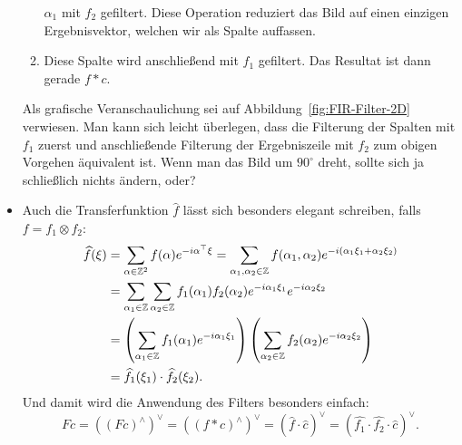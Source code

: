 \begin{remark}
\begin{itemize}
\begin{enumerate}
    $ \alpha_{1} $ mit $ f_{2} $ gefiltert. Diese Operation reduziert das Bild auf einen
    einzigen Ergebnisvektor, welchen wir als Spalte auffassen.
  \item Diese Spalte wird anschließend mit $ f_{1} $ gefiltert. Das Resultat ist dann gerade 
    $ f * c $.
  \end{enumerate}
  Als grafische Veranschaulichung sei auf Abbildung~\ref{fig:FIR-Filter-2D} verwiesen. Man kann
  sich leicht überlegen, dass die Filterung der Spalten mit $ f_{1} $ zuerst und anschließende
  Filterung der Ergebniszeile mit $ f_{2} $ zum obigen Vorgehen äquivalent ist. Wenn man das Bild um
  $ 90^{\circ} $ dreht, sollte sich ja schließlich nichts ändern, oder?
\item Auch die Transferfunktion $ \widehat{f} $ lässt sich besonders elegant schreiben, falls
  $ f = f_{1} \otimes f_{2} $:
  \begin{align*}
     \widehat{f}(\xi)
  &= \sum_{\alpha \in \mathbb{Z}^{2}} f(\alpha) e^{-i \alpha^{\top} \xi}
   = \sum_{\alpha_{1}, \alpha_{2} \in \mathbb{Z}} 
       f(\alpha_{1}, \alpha_{2}) e^{-i (\alpha_{1}\xi_{1} + \alpha_{2}\xi_{2})} \\
  &= \sum_{\alpha_{1} \in \mathbb{Z}} \sum_{\alpha_{2} \in \mathbb{Z}} 
        f_{1}(\alpha_{1}) f_{2}(\alpha_{2}) e^{-i\alpha_{1}\xi_{1}} e^{-i\alpha_{2}\xi_{2}} \\
  &= \left( \sum_{\alpha_{1} \in \mathbb{Z}} f_{1}(\alpha_{1}) e^{-i\alpha_{1}\xi_{1}} \right)
        \left( \sum_{\alpha_{2} \in \mathbb{Z}} f_{2}(\alpha_{2}) e^{-i\alpha_{2}\xi_{2}} \right) \\
  &= \widehat{f_{1}}(\xi_{1}) \cdot \widehat{f_{2}}(\xi_{2}).
  \end{align*}
  Und damit wird die Anwendung des Filters besonders einfach:
  \[
      Fc
    = \left( (Fc)^{\wedge} \right)^{\vee}
    = \left( (f * c)^{\wedge} \right)^{\vee}
    = \left( \widehat{f} \cdot \widehat{c} \right)^{\vee}
    = \left( \widehat{f_{1}} \cdot \widehat{f_{2}} \cdot \widehat{c} \right)^{\vee}.
  \]
\end{itemize}
\begin{figure}[ht]
\centering
{}
\end{figure}
\end{remark}
